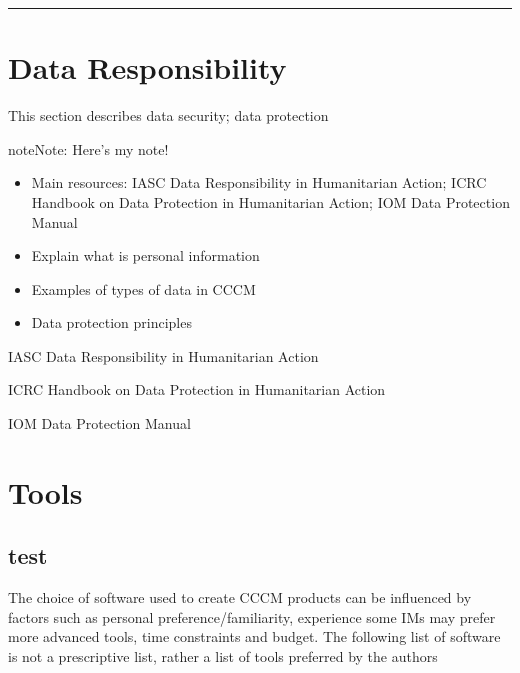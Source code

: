 \documentclass[letterpaper,10pt,english]{jupyterBook}
\begin{document}
\bigskip\hrule\bigskip



\chapter{Data Responsibility}
\label{\detokenize{part1/data responsibility:data-responsibility}}\label{\detokenize{part1/data responsibility::doc}}
\sphinxAtStartPar
This section describes data security; data protection

\begin{sphinxShadowBox}
\sphinxstylesidebartitle{}

\begin{sphinxadmonition}{note}{Note:}
\sphinxAtStartPar
Here’s my note!
\end{sphinxadmonition}
\end{sphinxShadowBox}

\sphinxAtStartPar
{}
\begin{itemize}
\item {} 
\sphinxAtStartPar
Main resources: IASC Data Responsibility in Humanitarian Action; ICRC Handbook on Data Protection in Humanitarian Action; IOM Data Protection Manual

\item {} 
\sphinxAtStartPar
Explain what is personal information

\item {} 
\sphinxAtStartPar
Examples of types of data in CCCM

\item {} 
\sphinxAtStartPar
Data protection principles

\end{itemize}

\sphinxAtStartPar
IASC Data Responsibility in Humanitarian Action

\sphinxAtStartPar
ICRC Handbook on Data Protection in Humanitarian Action

\sphinxAtStartPar
IOM Data Protection Manual


\chapter{Tools}
\label{\detokenize{part1/tools:tools}}\label{\detokenize{part1/tools::doc}}

\section{test}
\label{\detokenize{part1/tools:test}}
\sphinxAtStartPar
The choice of software used to create CCCM products can be influenced by factors such as personal preference/familiarity, experience \sphinxhyphen{} some IMs may prefer more advanced tools, time constraints and budget. The following list of software is not a prescriptive list, rather a list of tools preferred by the authors
\end{document}
